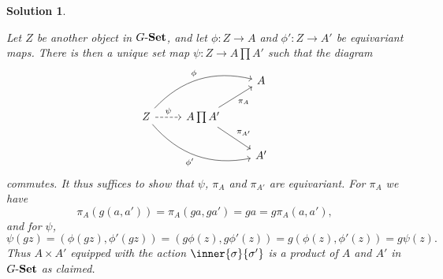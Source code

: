 \documentclass[article, a4paper, 11pt, oneside]{memoir}
\numberwithin{equation}{chapter}
\theoremstyle{nonumberplain}
\newtheorem{solution}{Solution}
\begin{document}
\begin{solution}
\begin{proofsec}
    Let $Z$ be another object in ${G\text{-}\mathbf{Set}}$, and let $\phi \colon Z \to A$ and $\phi' \colon Z \to A'$ be equivariant maps. There is then a unique set map $\psi \colon Z \to A \prod A'$ such that the diagram
    \begin{equation*}
        \begin{tikzcd}
            && A \\
            Z
                \ar[r, "\psi", dashed]
                \ar[urr, "\phi", bend left]
                \ar[drr, "\phi'", bend right, swap]
            & A \prod A'
                \ar[ur, "\pi_A", swap]
                \ar[dr, "\pi_{A'}"] \\
            && A'
        \end{tikzcd}
    \end{equation*}
    commutes. It thus suffices to show that $\psi$, $\pi_A$ and $\pi_{A'}$ are equivariant. For $\pi_A$ we have
    \begin{equation*}
        \pi_A(g(a,a'))
            = \pi_A(ga,ga')
            = ga
            = g \pi_A(a,a'),
    \end{equation*}
    and for $\psi$,
    \begin{equation*}
        \psi(gz)
            = (\phi(gz), \phi'(gz))
            = (g\phi(z), g\phi'(z))
            = g(\phi(z), \phi'(z))
            = g \psi(z).
    \end{equation*}
    Thus $A \times A'$ equipped with the action $\inner{\sigma}{\sigma'}$ is a product of $A$ and $A'$ in ${G\text{-}\mathbf{Set}}$ as claimed.


\end{proofsec}
\end{solution}
\end{document}
